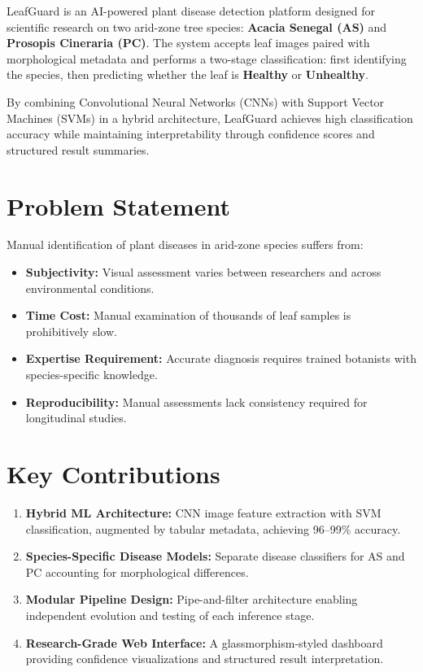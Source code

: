 \documentclass[11pt,a4paper,oneside]{report}
\begin{document}
LeafGuard is an AI-powered plant disease detection platform designed for scientific research on two arid-zone tree species: \textbf{Acacia Senegal (AS)} and \textbf{Prosopis Cineraria (PC)}. The system accepts leaf images paired with morphological metadata and performs a two-stage classification: first identifying the species, then predicting whether the leaf is \textbf{Healthy} or \textbf{Unhealthy}.

By combining Convolutional Neural Networks (CNNs) with Support Vector Machines (SVMs) in a hybrid architecture, LeafGuard achieves high classification accuracy while maintaining interpretability through confidence scores and structured result summaries.

\section{Problem Statement}

Manual identification of plant diseases in arid-zone species suffers from:
\begin{itemize}
  \item \textbf{Subjectivity:} Visual assessment varies between researchers and across environmental conditions.
  \item \textbf{Time Cost:} Manual examination of thousands of leaf samples is prohibitively slow.
  \item \textbf{Expertise Requirement:} Accurate diagnosis requires trained botanists with species-specific knowledge.
  \item \textbf{Reproducibility:} Manual assessments lack consistency required for longitudinal studies.
\end{itemize}

\section{Key Contributions}

\begin{enumerate}
  \item \textbf{Hybrid ML Architecture:} CNN image feature extraction with SVM classification, augmented by tabular metadata, achieving 96--99\% accuracy.
  \item \textbf{Species-Specific Disease Models:} Separate disease classifiers for AS and PC accounting for morphological differences.
  \item \textbf{Modular Pipeline Design:} Pipe-and-filter architecture enabling independent evolution and testing of each inference stage.
  \item \textbf{Research-Grade Web Interface:} A glassmorphism-styled dashboard providing confidence visualizations and structured result interpretation.
\end{enumerate}
\end{document}
